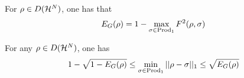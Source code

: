 \begin{definition}
    For $\rho \in D(\mathcal{H}^N)$, one has that 
    \begin{equation}
        E_G(\rho) = 1- \max_{\sigma\in\text{Prod}_1}F^2(\rho,\sigma)
    \end{equation}
\end{definition}

\begin{lemma}
    For any $\rho\in D(\mathcal{H}^N)$, one has
    \begin{equation}
        1 - \sqrt{1-E_G(\rho)} \leq \min_{\sigma\in\text{Prod}_1} ||\rho-\sigma||_1 \leq \sqrt{E_G(\rho)}
    \end{equation}
\end{lemma}